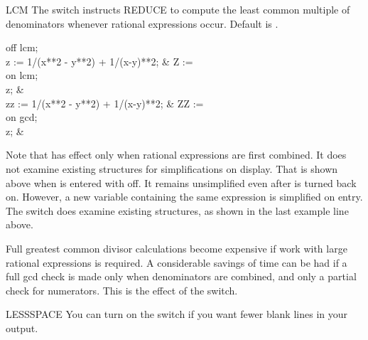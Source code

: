 \begin{Switch}{LCM}
The  switch instructs REDUCE to compute the least common multiple
of denominators whenever rational expressions occur.  Default is .

\begin{Examples}
off lcm; \\
z := 1/(x**2 - y**2) + 1/(x-y)**2;  
			     &     Z :=  \\
on lcm; \\
z;                           &      \\
zz := 1/(x**2 - y**2) + 1/(x-y)**2;
			     &     ZZ :=  \\
on gcd; \\
z;                           &     
\end{Examples}

\begin{Comments}
Note that  has effect only when rational expressions are first
combined.  It does not examine existing structures for simplifications on
display.  That is shown above when  is entered with
 off.  It remains unsimplified even after  is turned
back on.  However, a new variable containing the same expression is
simplified on entry.  The switch  does examine existing
structures, as shown in the last example line above.

Full greatest common divisor calculations become expensive if work with
large rational expressions is required.  A considerable savings of time
can be had if a full gcd check is made only when denominators are combined,
and only a partial check for numerators.  This is the effect of the 
switch.
\end{Comments}
\end{Switch}


\begin{Switch}{LESSSPACE}
You can turn on the switch  if you want fewer
blank lines in your output.
\end{Switch}


